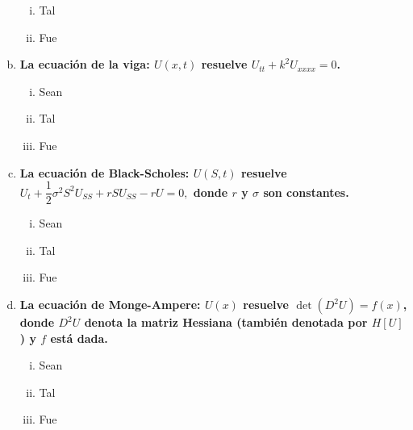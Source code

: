 \documentclass[fleqn]{article}
\begin{document}
\begin{enumerate}[(a)]
\begin{enumerate}[(i)]
			\item Tal
			
			\item Fue
		\end{enumerate}

		\item \textbf{La ecuación de la viga: $ U(x,t) $ resuelve $ U_{tt} + k^2 U_{xxxx} = 0 $.}
		
		\begin{enumerate}[(i)]
			\item Sean 
			
			\item Tal
			
			\item Fue
		\end{enumerate}

		\item \textbf{La ecuación de Black-Scholes: $ U(S,t) $ resuelve $ U_t + \dfrac{1}{2} \sigma^2 S^2 U_{SS} + rS U_{SS} - rU = 0, $ donde $ r $ y $ \sigma $ son constantes.}
		
		\begin{enumerate}[(i)]
			\item Sean 
			
			\item Tal
			
			\item Fue
		\end{enumerate}

		\item \textbf{La ecuación de Monge-Ampere: $ U(x) $ resuelve $ \det(D^2 U) = f(x) $, donde $ D^2 U $ denota la matriz Hessiana (también denotada por $ H[U] $) y $ f $ está dada.}
		
		\begin{enumerate}[(i)]
			\item Sean 
			
			\item Tal
			
			\item Fue
		\end{enumerate}

	\end{enumerate}
\end{document}
